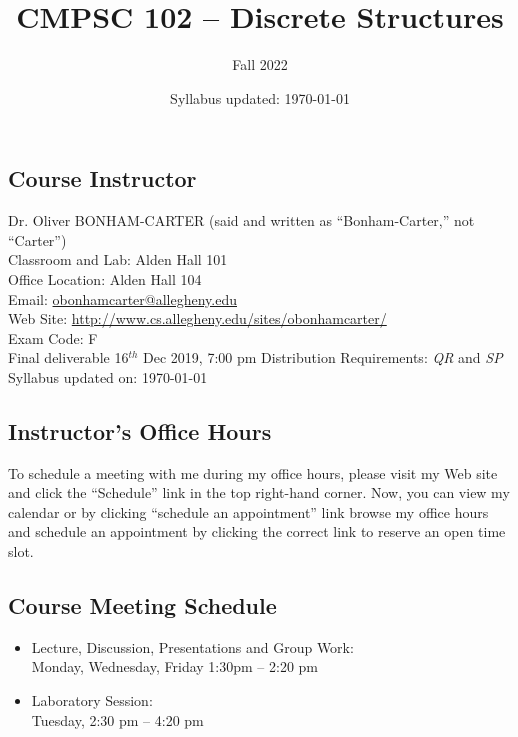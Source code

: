 \documentclass[11pt]{article} %
\title{\textbf{CMPSC 102 -- Discrete Structures}}
\author{Fall 2022}
\date{Syllabus updated: \today} %
\begin{document}
\maketitle

\subsection*{\textbf{Course Instructor}}
Dr. Oliver BONHAM-CARTER (said and written as ``Bonham-Carter,'' not “Carter'')\\
\noindent Classroom and Lab: Alden Hall 101 \\
\noindent Office Location: Alden Hall 104 \\
\noindent Email: \url{obonhamcarter@allegheny.edu} \\
\noindent Web Site: \url{http://www.cs.allegheny.edu/sites/obonhamcarter/} \\
\noindent Exam Code: F\\
\noindent Final deliverable 16$^{th}$ Dec 2019, 7:00 pm
\noindent Distribution Requirements: \emph{QR} and \emph{SP}\\
\noindent Syllabus updated on: \today\\


\subsection*{Instructor's Office Hours}




\noindent
To schedule a meeting with me during my office hours, please visit my Web site and click the ``Schedule'' link in the top right-hand corner. Now, you can view my calendar or by clicking ``schedule an appointment'' link browse my office hours and schedule an appointment by clicking the correct link to reserve an open time slot. 




\subsection*{\textbf{Course Meeting Schedule}}
\begin{itemize}
    \item Lecture, Discussion, Presentations and Group Work:\\
        \indent Monday, Wednesday, Friday 1:30pm -- 2:20 pm 
    \item Laboratory Session:\\
        \indent Tuesday, 2:30 pm -- 4:20 pm \\
\end{itemize}
\end{document}
